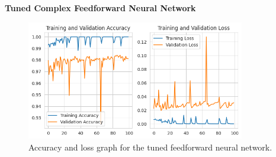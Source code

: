 \textbf{Tuned Complex Feedforward Neural Network}

\begin{figure}[ht]
    \centering
    \includegraphics[width=0.85\textwidth]{./img/ffnn/tuned/accuracy-loss-graph}
    \caption{Accuracy and loss graph for the tuned feedforward neural network.}
    \label{fig:ffnn-tuned-accuracy-loss-graph}
\end{figure}

